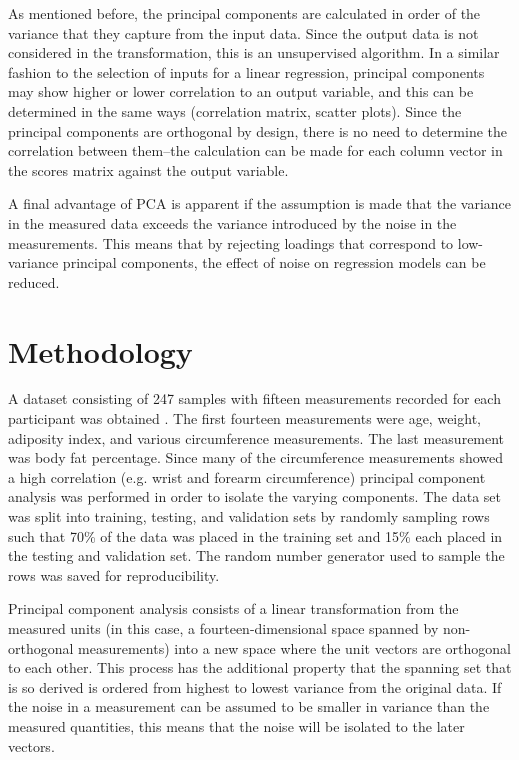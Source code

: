 \documentclass{IEEEtran}
\begin{document}
As mentioned before, the principal components are calculated in order of the variance that they capture from the input data. Since the output data is not considered in the transformation, this is an unsupervised algorithm. In a similar fashion to the selection of inputs for a linear regression, principal components may show higher or lower correlation to an output variable, and this can be determined in the same ways (correlation matrix, scatter plots). Since the principal components are orthogonal by design, there is no need to determine the correlation between them--the calculation can be made for each column vector in the scores matrix against the output variable.

A final advantage of PCA is apparent if the assumption is made that the variance in the measured data exceeds the variance introduced by the noise in the measurements. This means that by rejecting loadings that correspond to low-variance principal components, the effect of noise on regression models can be reduced.

\section{Methodology} 

A dataset consisting of 247 samples with fifteen measurements recorded for each participant was obtained \cite{Penrose1985}. The first fourteen measurements were age, weight, adiposity index, and various circumference measurements. The last measurement was body fat percentage. Since many of the circumference measurements showed a high correlation (e.g. wrist and forearm circumference) principal component analysis was performed in order to isolate the varying components. The data set was split into training, testing, and validation sets by randomly sampling rows such that 70\% of the data was placed in the training set and 15\% each placed in the testing and validation set. The random number generator used to sample the rows was saved for reproducibility. 

Principal component analysis consists of a linear transformation from the measured units (in this case, a fourteen-dimensional space spanned by non-orthogonal measurements) into a new space where the unit vectors are orthogonal to each other. This process has the additional property that the spanning set that is so derived is ordered from highest to lowest variance from the original data. If the noise in a measurement can be assumed to be smaller in variance than the measured quantities, this means that the noise will be isolated to the later vectors.
\end{document}
